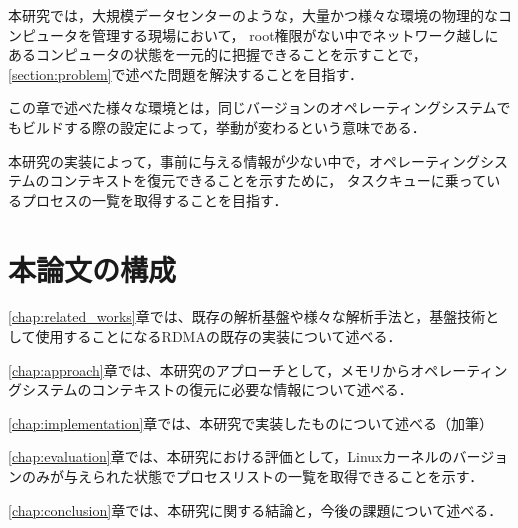 本研究では，大規模データセンターのような，大量かつ様々な環境の物理的なコンピュータを管理する現場において，
root権限がない中でネットワーク越しにあるコンピュータの状態を一元的に把握できることを示すことで，\ref{section:problem}で述べた問題を解決することを目指す．

この章で述べた様々な環境とは，同じバージョンのオペレーティングシステムでもビルドする際の設定によって，挙動が変わるという意味である．

本研究の実装によって，事前に与える情報が少ない中で，オペレーティングシステムのコンテキストを復元できることを示すために，
タスクキューに乗っているプロセスの一覧を取得することを目指す．





\section{本論文の構成}

\ref{chap:related_works}章では、既存の解析基盤や様々な解析手法と，基盤技術として使用することになるRDMAの既存の実装について述べる．

\ref{chap:approach}章では、本研究のアプローチとして，メモリからオペレーティングシステムのコンテキストの復元に必要な情報について述べる．

\ref{chap:implementation}章では、本研究で実装したものについて述べる（加筆）

\ref{chap:evaluation}章では、本研究における評価として，Linuxカーネルのバージョンのみが与えられた状態でプロセスリストの一覧を取得できることを示す．

\ref{chap:conclusion}章では、本研究に関する結論と，今後の課題について述べる．
